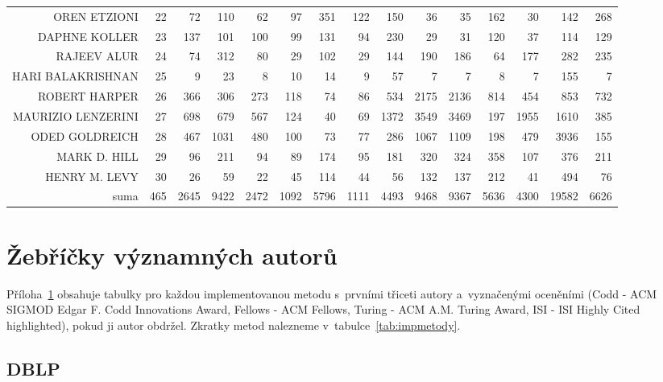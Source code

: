 \documentclass{bakalarka}
\begin{document}
\begin{table}[!ht]
\begin{sideways}
\begin{scriptsize}
\begin{tabular}{r|r|rrrrrrrrrrrrr}
OREN ETZIONI&22&72&110&62&97&351&122&150&36&35&162&30&142&268\\
DAPHNE KOLLER&23&137&101&100&99&131&94&230&29&31&120&37&114&129\\
RAJEEV ALUR&24&74&312&80&29&102&29&144&190&186&64&177&282&235\\
HARI BALAKRISHNAN&25&9&23&8&10&14&9&57&7&7&8&7&155&7\\
ROBERT HARPER&26&366&306&273&118&74&86&534&2175&2136&814&454&853&732\\
MAURIZIO LENZERINI&27&698&679&567&124&40&69&1372&3549&3469&197&1955&1610&385\\
ODED GOLDREICH&28&467&1031&480&100&73&77&286&1067&1109&198&479&3936&155\\
MARK D. HILL&29&96&211&94&89&174&95&181&320&324&358&107&376&211\\
HENRY M. LEVY&30&26&59&22&45&114&44&56&132&137&212&41&494&76\\
\midrule
suma&465&2645&9422&2472&1092&5796&1111&4493&9468&9367&5636&4300&19582&6626\\
\bottomrule
\end{tabular}
\end{scriptsize}
\end{sideways}
\end{table}

\newpage
\chapter{Žebříčky významných autorů}
\label{chapter:zebricky}

Příloha~\ref{chapter:zebricky} obsahuje tabulky pro každou implementovanou
metodu s~prvními třiceti autory a~vyznačenými oceněními (Codd - ACM SIGMOD
Edgar F. Codd Innovations Award, Fellows - ACM Fellows, Turing - ACM A.M.
Turing Award, ISI - ISI Highly Cited highlighted), pokud ji autor obdržel.
Zkratky metod nalezneme v~tabulce~\ref{tab:impmetody}.

\newpage
\section{DBLP}
\label{section:zebrickydblp}















\end{document}
